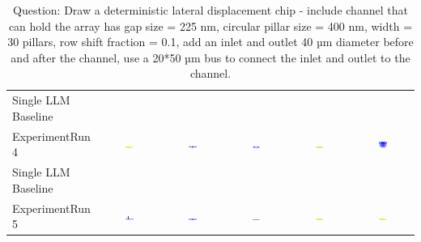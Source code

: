 \begin{table}
\begin{tabular}{@{}lccccc@{}}
    Single LLM Baseline \\
    ExperimentRun 4 & \includegraphics[width=0.15\textwidth]{./run_4/png/gpt-4o_results/DLDChip.png} & \includegraphics[width=0.15\textwidth]{./run_4/png/o1-preview_results/DLDChip.png} & \includegraphics[width=0.15\textwidth]{./run_4/png/claude-3-5-sonnet-20240620_results/DLDChip.png} & \includegraphics[width=0.15\textwidth]{./run_4/png/watsonx_meta-llama_llama-3-1-70b-instruct_results/DLDChip.png} & \includegraphics[width=0.15\textwidth]{./run_4/png/watsonx_meta-llama_llama-3-405b-instruct_results/DLDChip.png} \\
    Single LLM Baseline \\
    ExperimentRun 5 & \includegraphics[width=0.15\textwidth]{./run_5/png/gpt-4o_results/DLDChip.png} & \includegraphics[width=0.15\textwidth]{./run_5/png/o1-preview_results/DLDChip.png} & \includegraphics[width=0.15\textwidth]{./run_5/png/claude-3-5-sonnet-20240620_results/DLDChip.png} & \includegraphics[width=0.15\textwidth]{./run_5/png/watsonx_meta-llama_llama-3-1-70b-instruct_results/DLDChip.png} & \includegraphics[width=0.15\textwidth]{./run_5/png/watsonx_meta-llama_llama-3-405b-instruct_results/DLDChip.png} \\
    \bottomrule
  \end{tabular}
  \caption*{Question: Draw a deterministic lateral displacement chip - include channel that can hold the array has gap size = 225 nm, circular pillar size = 400 nm, width = 30 pillars, row shift fraction = 0.1, add an inlet and outlet 40 µm diameter before and after the channel, use a 20*50 µm bus to connect the inlet and outlet to the channel.}
\end{table}

